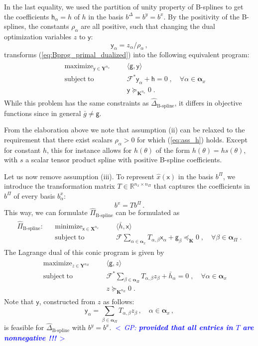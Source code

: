 \documentclass{article}
\DeclareMathOperator*{\minimize}{minimize}
\DeclareMathOperator*{\maximize}{maximize}
\DeclareMathOperator*{\subj}{subject\;to}
\newcommand{\commentGP}[1]{\noindent \textcolor{blue}{\emph{$<\,$GP: #1$\,>$}}}%
\newcommand{\R}{\mathbb{R}}         %
\newcommand{\adj}{\ast}                     %
\newcommand{\ppar}{\theta}                          %
\newcommand{\X}{\mathbf{X}}                         %
\newcommand{\Y}{\mathbf{Y}}                         %
\newcommand{\K}{\mathbf{K}}                         %
\newcommand{\calF}{\mathcal{F}}                     %
\newcommand{\bx}{b^x}               %
\newcommand{\bxa}{\bx_\alpha}       %
\newcommand{\cx}{\textsf{x}}        %
\newcommand{\nx}{{n_x}}             %
\newcommand{\by}{b^y}               %
\newcommand{\cy}{\textsf{y}}        %
\newcommand{\cya}{\cy_\alpha}       %
\newcommand{\Alpha}{\bm{\alpha}}    %
\newcommand{\meanh}{\bar{h}}        %
\newcommand{\meanha}{\meanh_\alpha} %
\newcommand{\meang}{\bar{g}}        %
\newcommand{\bPi}{b^\Pi}                %
\newcommand{\nPi}{{n_\Pi}}              %
\newcommand{\cg}{\textsf{g}}            %
\newcommand{\bDelta}{b^\Delta}          %
\newcommand{\ch}{\textsf{h}}            %
\newcommand{\cha}{\textsf{h}_\alpha}    %
\begin{document}
In the last equality, we used the partition of unity property of B-splines to get the coefficients $\cha=h$ of $h$ in the basis $\bDelta=\by=\bx$. By the positivity of the B-splines, the constants $\rho_\alpha$ are all positive, such that changing the dual optimization variables $z$ to $\cy$:
\[ \cya = z_\alpha / \rho_\alpha \,,
\]
transforms (\ref{eq:Bprog_primal_dualized}) into the following equivalent program:
\begin{gather*}
\begin{aligned}
 && \maximize_{\cy\in\Y^\nx} &&& \langle \cg , \cy \rangle    \\%
 && \subj                    &&& \calF^* \cy_\alpha + \ch = 0 \;, \quad \forall \alpha\in \Alpha_x\\%
 &&                          &&& \cy \succeq_{\K^\nx} 0 \;.
\end{aligned}
\end{gather*}
While this problem has the same constraints as $\hat{\Delta}_{\text{B-spline}}$, it differs in objective functions since in general $\meang\neq\cg$.

From the elaboration above we note that assumption (ii) can be relaxed to the requirement that there exist scalars $\rho_\alpha>0$ for which (\ref{eq:ass_h}) holds. Except for constant $h$, this for instance allows for $h(\ppar)$ of the form $h(\ppar)=h s(\ppar)$, with $s$ a scalar tensor product spline with positive B-spline coefficients.

Let us now remove assumption (iii). To represent $\hat{x}(\cx)$ in the basis $\bPi$, we introduce the transformation matrix $T\in\R^{\nx\times\nPi}$ that captures the coefficients in $\bPi$ of every basis $\bxa$:
\[ \bx = T \bPi\,.
\]
This way, we can formulate
$\hat{\Pi}_\text{B-spline}$ can be formulated as
\begin{gather*}
\begin{aligned}
\hat{\Pi}_\text{B-spline}: && \minimize_{\cx\in\X^\nx} &&& \langle \meanh, \cx \rangle    \\%
                           && \subj                    &&& \calF \sum_{\alpha\in\Alpha_x} T_{\alpha,\beta}\cx_\alpha + \cg_\beta \preceq_\K 0 \;, \quad \forall \beta\in\Alpha_\Pi\;.%
\end{aligned}
\end{gather*}
The Lagrange dual of this conic program is given by
\begin{gather}
\begin{aligned}
 && \maximize_{z\in\Y^\nPi} &&& \langle \cg, z \rangle    \\%
 && \subj                   &&& \calF^\adj \sum_{\beta\in\Alpha_\Pi} T_{\alpha,\beta}z_\beta +  \meanha = 0 \;, \quad \forall \alpha\in \Alpha_x\\%
 &&                         &&& z \succeq_{\K^\nPi} 0 \;.%
\end{aligned}
\end{gather}
Note that $\cy$, constructed from $z$ as follows:
\[ \cya = \sum_{\beta\in\Alpha_\Pi} T_{\alpha,\beta}z_\beta\,,\quad\alpha\in\Alpha_x\,,%
\]
is feasible for $\hat{\Delta}_\text{B-spline}$ with $\by=\bx$. \commentGP{\bf provided that all entries in $T$ are nonnegative !!!}
\end{document}
